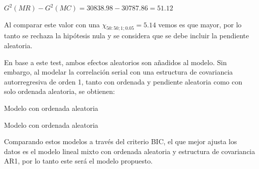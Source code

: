 \documentclass[spanish]{article}
\numberwithin{figure}{subsection}
\numberwithin{equation}{subsection}
\numberwithin{table}{subsection}
\begin{document}
$ G^2(MR) - G^2(MC) = 30838.98 - 30787.86 = 51.12 $

Al comparar este valor con una $\chi_{50:50;1;0.05} = 5.14$ vemos es que mayor,
por lo tanto se rechaza la hipótesis nula y se considera que se debe incluir la
pendiente aleatoria.

En base a este test, ambos efectos aleatorios son añadidos al modelo. Sin
embargo, al modelar la correlación serial con una estructura de covariancia
autorregresiva de orden 1, tanto con ordenada y pendiente aleatoria como con
solo ordenada aleatoria, se obtienen:

\begin{table}[H]
	\centering
	\caption{Modelo con ordenada aleatoria}
	\label{modelo_both_ar1}
	
\end{table}

\begin{table}[H]
	\centering
	\caption{Modelo con ordenada aleatoria}
	\label{modelo_intercept_ar1}
	
\end{table}

Comparando estos modelos a través del criterio BIC, el que mejor ajusta los
datos es el modelo lineal mixto con ordenada aleatoria y estructura de
covariancia AR1, por lo tanto este será el modelo propuesto.

\newpage
\nocite{*}
\renewcommand{\refname}{Bibliografía}

\end{document}
